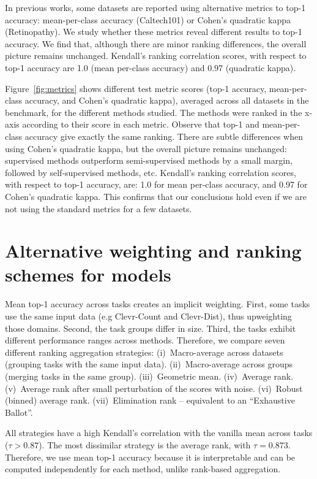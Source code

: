 \documentclass{article}
\begin{document}
In previous works, some datasets are
reported using alternative metrics to top-1 accuracy:
mean-per-class accuracy (Caltech101)
or Cohen's quadratic kappa (Retinopathy).
We study whether these metrics reveal different results to top-1 accuracy.
We find that, although there are minor ranking differences, the overall picture remains unchanged.
Kendall's ranking correlation scores, with respect to top-1 accuracy are 1.0 (mean per-class accuracy) and 0.97 (quadratic kappa).

Figure~\ref{fig:metrics} shows different test metric scores
(top-1 accuracy, mean-per-class accuracy, and Cohen's quadratic kappa),
averaged across all datasets in the benchmark, for the different methods
studied. The methods were ranked in the x-axis according to their score 
in each metric.
Observe that top-1 and mean-per-class accuracy give exactly the same
ranking. There are subtle differences when using
Cohen's quadratic kappa, but the overall picture
remains unchanged: supervised methods outperform semi-supervised methods
by a small margin, followed by self-supervised methods, etc.
Kendall's ranking correlation scores, with respect to top-1 accuracy, are:
1.0 for mean per-class accuracy, and 0.97 for Cohen's quadratic kappa.
This confirms that our conclusions hold even if we are not using the standard
metrics for a few datasets.


\clearpage
\section{Alternative weighting and ranking schemes for models\label{app:alt-model-ranking}}

Mean top-1 accuracy across tasks creates an implicit weighting.
First, some tasks use the same input data (e.g Clevr-Count and Clevr-Dist), thus upweighting those domains.
Second, the task groups differ in size.
Third, the tasks exhibit different performance ranges across methods.
Therefore, we compare seven different ranking aggregation strategies:
(i)~Macro-average across datasets (grouping tasks with the same input data).
(ii)~Macro-average across groups (merging tasks in the same group).
(iii)~Geometric mean.
(iv)~Average rank.
(v)~Average rank after small perturbation of the scores with noise.
(vi)~Robust (binned) average rank.
(vii)~Elimination rank -- equivalent to an ``Exhaustive Ballot''.

All strategies have a high Kendall's correlation with the vanilla mean across tasks ($\tau>0.87$).
The most dissimilar strategy is the average rank, with $\tau=0.873$.
Therefore, we use mean top-1 accuracy because it is interpretable and can be computed independently for each method, unlike rank-based aggregation.
\end{document}
